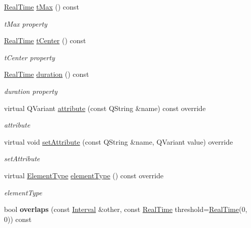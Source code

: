 \begin{DoxyCompactItemize}
\hyperlink{struct_real_time}{Real\+Time} \hyperlink{class_interval_ab9efa1b25d5e4997d99ad0f360c7b2d7}{t\+Max} () const
\begin{DoxyCompactList}\small\item\em t\+Max property \end{DoxyCompactList}\item 
\hyperlink{struct_real_time}{Real\+Time} \hyperlink{class_interval_aa2f9a9cd972d33c1eb3af5e760e759b0}{t\+Center} () const
\begin{DoxyCompactList}\small\item\em t\+Center property \end{DoxyCompactList}\item 
\hyperlink{struct_real_time}{Real\+Time} \hyperlink{class_interval_a1b35d8374a045798f2cdc19d365855de}{duration} () const
\begin{DoxyCompactList}\small\item\em duration property \end{DoxyCompactList}\item 
virtual Q\+Variant \hyperlink{class_interval_aebcaee36c1adf49669d8a0faa16a335f}{attribute} (const Q\+String \&name) const override
\begin{DoxyCompactList}\small\item\em attribute \end{DoxyCompactList}\item 
virtual void \hyperlink{class_interval_a0895204effc21e1f4ead9b78b4b9726f}{set\+Attribute} (const Q\+String \&name, Q\+Variant value) override
\begin{DoxyCompactList}\small\item\em set\+Attribute \end{DoxyCompactList}\item 
virtual \hyperlink{class_annotation_element_af5282990ffbe25eeea8ab02037e344b0}{Element\+Type} \hyperlink{class_interval_a3ea5342504df09262d59cd2ab1658804}{element\+Type} () const override
\begin{DoxyCompactList}\small\item\em element\+Type \end{DoxyCompactList}\item 
\mbox{\label{class_interval_a06203012d1dd561adb205db6d578e433}} 
bool {\bfseries overlaps} (const \hyperlink{class_interval}{Interval} \&other, const \hyperlink{struct_real_time}{Real\+Time} threshold=\hyperlink{struct_real_time}{Real\+Time}(0, 0)) const
\item 

\end{DoxyCompactItemize}
